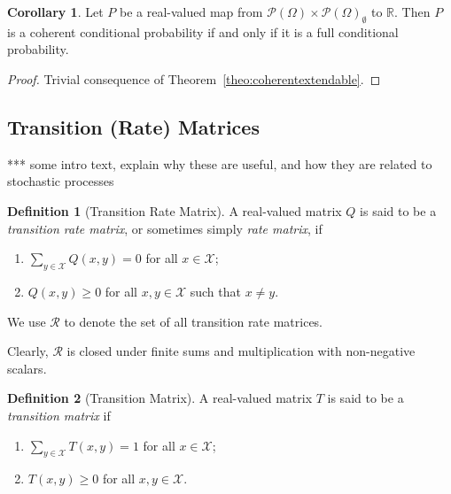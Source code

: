 \documentclass[10pt]{paper}
\theoremstyle{definition}
\newtheorem{corollary}[theorem]{Corollary}
\newtheorem{definition}{Definition}
\newcommand{\reals}{\mathbb{R}}
\newcommand{\states}{\mathcal{X}}
\newcommand{\paths}{\Omega}
\newcommand{\power}{\mathcal{P}(\paths)}
\newcommand{\nonemptypower}{\power_{\emptyset}}
\begin{document}
\begin{corollary}\label{corol:fullcoherent}
Let $P$ be a real-valued map from $\power\times\nonemptypower$ to $\reals$. Then $P$ is a coherent conditional probability if and only if it is a full conditional probability.
\end{corollary}
\begin{proof}
Trivial consequence of Theorem~\ref{theo:coherentextendable}.
\end{proof}

\subsection{Transition (Rate) Matrices}\label{sec:trans_rate_matrices}

*** some intro text, explain why these are useful, and how they are related to stochastic processes

\begin{definition}[Transition Rate Matrix]\label{def:rate_matrix}
A real-valued matrix $Q$ is said to be a \emph{transition rate matrix}, or sometimes simply \emph{rate matrix}, if

\vspace{5pt}
\begin{enumerate}[label=R\arabic*:]
\item
$\sum_{y\in\states}Q(x,y)=0$ for all $x\in\states$;
\item
$Q(x,y)\geq0$ for all $x,y\in\states$ such that $x\neq y$.
\end{enumerate}
\vspace{5pt}
\noindent
We use $\mathcal{R}$ to denote the set of all transition rate matrices. 
\end{definition}

\noindent Clearly, $\mathcal{R}$ is closed under finite sums and multiplication with non-negative scalars. 

\begin{definition}[Transition Matrix]\label{def:stoch_matrix}
A real-valued matrix $T$ is said to be a \emph{transition matrix} if
\vspace{5pt}
\begin{enumerate}[label=S\arabic*:,ref=N\arabic*]
\item
$\sum_{y\in\states}T(x,y)=1$ for all $x\in\states$;\label{def:trans_matrix_is_stochastic}
\item
$T(x,y)\geq0$ for all $x,y\in\states$.
\end{enumerate}
\vspace{5pt}
\noindent
\end{definition}
\end{document}
